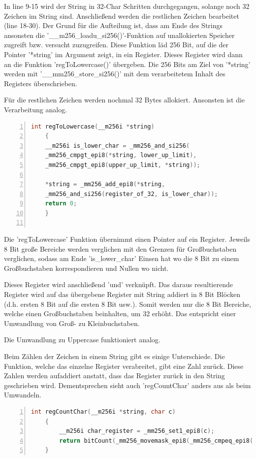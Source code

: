 \documentclass[plainarticle,zihtitle,german,final,hyperref,utf8]{zihpub}
\begin{document}
In line 9-15 wird der String in 32-Char Schritten durchgegangen, solange noch 32 Zeichen im String sind.
Anschließend werden die restlichen Zeichen bearbeitet (line 18-30). Der Grund für die Aufteilung ist, dass am Ende des Strings ansonsten die '\_\_m256\_loadu\_si256()'-Funktion auf unallokierten Speicher zugreift bzw. versucht zuzugreifen. Diese Funktion läd 256 Bit, auf die der Pointer '{*}string' im Argument zeigt, in ein Register.
Dieses Register wird dann an die Funktion 'regToLowercase()' übergeben. Die 256 Bits am Ziel von '{*}string' werden mit '\_\_mm256\_store\_si256()' mit dem verarbeitetem Inhalt des Registers überschrieben.

Für die restlichen Zeichen werden nochmal 32 Bytes allokiert. Ansonsten ist die Verarbeitung analog.

\begin{lstlisting}[language=c, numbers=left]
	int regToLowercase(__m256i *string)
	{
	__m256i is_lower_char = _mm256_and_si256(
	_mm256_cmpgt_epi8(*string, lower_up_limit),
	_mm256_cmpgt_epi8(upper_up_limit, *string));

	*string = _mm256_add_epi8(*string,
	_mm256_and_si256(register_of_32, is_lower_char));
	return 0;
	}
	
\end{lstlisting}

Die 'regToLowercase' Funktion übernimmt einen Pointer auf ein Register. Jeweils 8 Bit große Bereiche werden verglichen mit den Grenzen für Großbuchstaben verglichen, sodass am Ende 'is\_lower\_char' Einsen hat wo die 8 Bit zu einem Großbuchstaben korrespondieren und Nullen wo nicht.

Dieses Register wird anschließend 'und' verknüpft. Das daraus resultierende Register wird auf das übergebene Register mit String addiert in 8 Bit Blöcken (d.h. ersten 8 Bit auf die ersten 8 Bit usw.). Somit werden nur die 8 Bit Bereiche, welche einen Großbuchstaben beinhalten, um 32 erhöht. Das entspricht einer Umwandlung von Groß- zu Kleinbuchstaben.

Die Umwandlung zu Uppercase funktioniert analog.

Beim Zählen der Zeichen in einem String gibt es einige Unterschiede. Die Funktion, welche das einzelne Register verabreitet, gibt eine Zahl zurück. Diese Zahlen werden aufaddiert anstatt, dass das Register zurück in den String geschrieben wird.
Dementsprechen sieht auch 'regCountChar' anders aus als beim Umwandeln.

\begin{lstlisting}[language=c, numbers=left]
	int regCountChar(__m256i *string, char c)
	{
		__m256i char_register = _mm256_set1_epi8(c);
		return bitCount(_mm256_movemask_epi8(_mm256_cmpeq_epi8(*string, char_register)));
	}
\end{lstlisting}
\end{document}
